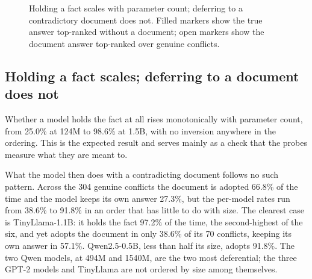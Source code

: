 \documentclass[10pt,conference]{IEEEtran}
\begin{document}
\begin{figure}[t]
\centering
{}
\caption{Holding a fact scales with parameter count; deferring to a contradictory document does not. Filled markers show the true answer top-ranked without a document; open markers show the document answer top-ranked over genuine conflicts.}
\label{fig:scale}
\end{figure}

\subsection{Holding a fact scales; deferring to a document does not}
Whether a model holds the fact at all rises monotonically with parameter count, from 25.0\% at 124M to 98.6\% at 1.5B, with no inversion anywhere in the ordering. This is the expected result and serves mainly as a check that the probes measure what they are meant to.

What the model then does with a contradicting document follows no such pattern. Across the 304 genuine conflicts the document is adopted 66.8\% of the time and the model keeps its own answer 27.3\%, but the per-model rates run from 38.6\% to 91.8\% in an order that has little to do with size. The clearest case is TinyLlama-1.1B: it holds the fact 97.2\% of the time, the second-highest of the six, and yet adopts the document in only 38.6\% of its 70 conflicts, keeping its own answer in 57.1\%. Qwen2.5-0.5B, less than half its size, adopts 91.8\%. The two Qwen models, at 494M and 1540M, are the two most deferential; the three GPT-2 models and TinyLlama are not ordered by size among themselves.
\end{document}

